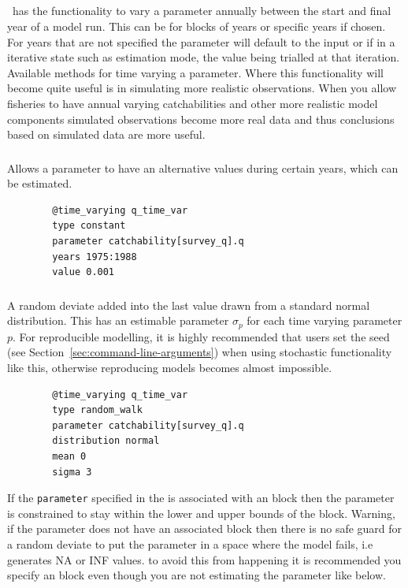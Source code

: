 \subsection{\label{sec:time_var}}

\CNAME\ has the functionality to vary a parameter annually between the start and final year of a model run. This can be for blocks of years or specific years if chosen. For years that are not specified the parameter will default to the input or if in a iterative state such as estimation mode, the value being trialled at that iteration. Available methods for time varying a parameter. Where this functionality will become quite useful is in simulating more realistic observations. When you allow fisheries to have annual varying catchabilities and other more realistic model components simulated observations become more real data and thus conclusions based on simulated data are more useful.

\subsubsection[Constant]{}
Allows a parameter to have an alternative values during certain years, which can be estimated.
{\small{\begin{verbatim}
		@time_varying q_time_var
		type constant
		parameter catchability[survey_q].q
		years 1975:1988
		value 0.001
		\end{verbatim}}}

\subsubsection[Random Walk]{}

A random deviate added into the last value drawn from a standard normal distribution. This has an estimable parameter $\sigma_p$ for each time varying parameter $p$. For reproducible modelling, it is highly recommended that users set the seed (see Section~\ref{sec:command-line-arguments}) when using stochastic functionality like this, otherwise reproducing models becomes almost impossible.
{\small{\begin{verbatim}
		@time_varying q_time_var
		type random_walk
		parameter catchability[survey_q].q
		distribution normal
		mean 0
		sigma 3
		\end{verbatim}}}

If the \texttt{parameter} specified in the  is associated with an  block then the parameter is constrained to stay within the lower and upper bounds of the  block. Warning, if the parameter does not have an associated  block then there is no safe guard for a random deviate to put the parameter in a space where the model fails, i.e generates NA or INF values. to avoid this from happening it is recommended you specify an  block even though you are not estimating the parameter like below.

